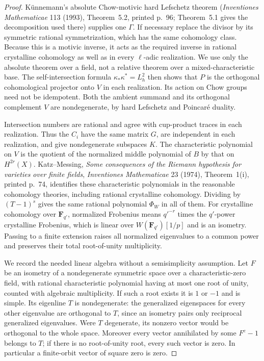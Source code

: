 \documentclass[11pt]{article}
\theoremstyle{remark}\newtheorem{remark}[theorem]{Remark}
\begin{document}
\begin{proof}
K\"unnemann's absolute Chow-motivic hard Lefschetz theorem
(\emph{Inventiones Mathematicae} 113 (1993), Theorem~5.2,
printed p.~96; Theorem~5.1 gives the decomposition used there)
supplies one $\Gamma$. If necessary replace the divisor by its
symmetric rational symmetrization, which has the same cohomology
class. Because this is a motivic inverse, it acts as the required
inverse in rational crystalline cohomology as well as in every
$\ell$-adic realization. We use only the absolute theorem over a
field, not a relative theorem over a mixed-characteristic base.
The self-intersection formula $\kappa_*\kappa^*=L_h^2$ then shows
that $P$ is the orthogonal cohomological projector onto $V$ in
each realization. Its action on Chow groups need not be idempotent.
Both the ambient summand and its orthogonal complement $V$ are
nondegenerate, by hard Lefschetz and Poincar\'e duality.

Intersection numbers are rational and agree with cup-product
traces in each realization. Thus the $C_i$ have the same matrix
$G$, are independent in each realization, and give nondegenerate
subspaces $K$. The characteristic polynomial on $V$ is the quotient
of the normalized middle polynomial of $B$ by that on
$H^{2r}(X)$. Katz--Messing, \emph{Some consequences of the Riemann
hypothesis for varieties over finite fields}, \emph{Inventiones
Mathematicae} 23 (1974), Theorem~1(i), printed p.~74, identifies
these characteristic polynomials in the reasonable cohomology
theories, including rational crystalline cohomology. Dividing by
$(T-1)^s$ gives the same rational polynomial $\Phi_W$ in all of them.
For crystalline cohomology over $\mathbf F_{q'}$, normalized
Frobenius means $q'^{-r}$ times the $q'$-power crystalline Frobenius,
which is linear over $W(\mathbf F_{q'})[1/p]$ and is an isometry.
Passing to a finite extension raises all normalized eigenvalues
to a common power and preserves their total root-of-unity
multiplicity.

We record the needed linear algebra without a semisimplicity
assumption. Let $F$ be an isometry of a nondegenerate symmetric
space over a characteristic-zero field, with rational
characteristic polynomial having at most one root of unity,
counted with algebraic multiplicity. If such a root exists it is
$1$ or $-1$ and is simple. Its eigenline $T$ is nondegenerate:
the generalized eigenspaces for every other eigenvalue are
orthogonal to $T$, since an isometry pairs only reciprocal
generalized eigenvalues. Were $T$ degenerate, its nonzero vector
would be orthogonal to the whole space. Moreover every vector
annihilated by some $F^e-1$ belongs to $T$; if there is no
root-of-unity root, every such vector is zero. In particular a
finite-orbit vector of square zero is zero.


\end{proof}
\end{document}
